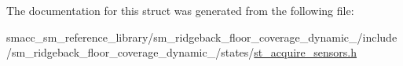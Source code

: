 The documentation for this struct was generated from the following file\+:\begin{DoxyCompactItemize}
\item 
smacc\+\_\+sm\+\_\+reference\+\_\+library/sm\+\_\+ridgeback\+\_\+floor\+\_\+coverage\+\_\+dynamic\+\_/include/sm\+\_\+ridgeback\+\_\+floor\+\_\+coverage\+\_\+dynamic\+\_/states/\hyperlink{sm__ridgeback__floor__coverage__dynamic__1_2include_2sm__ridgeback__floor__coverage__dynamic__1_df035bf5d633a4b0084571c4e866bf36}{st\+\_\+acquire\+\_\+sensors.\+h}\end{DoxyCompactItemize}
